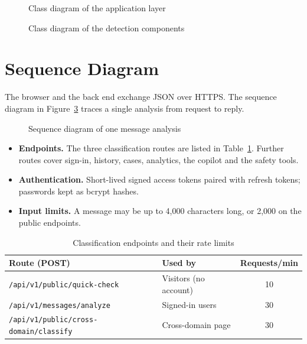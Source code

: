 \begin{figure}[H]
\centering
\resizebox{\linewidth}{!}{}
\caption{Class diagram of the application layer}
\label{fig:class1}
\end{figure}

\begin{figure}[H]
\centering
\resizebox{0.95\linewidth}{!}{}
\caption{Class diagram of the detection components}
\label{fig:class2}
\end{figure}

\section{Sequence Diagram}
The browser and the back end exchange JSON over HTTPS. The sequence diagram in Figure~\ref{fig:seq} traces a single analysis from request to reply.

\begin{figure}[H]
\centering
\resizebox{0.95\linewidth}{!}{}
\caption{Sequence diagram of one message analysis}
\label{fig:seq}
\end{figure}

\begin{itemize}
\item \textbf{Endpoints.} The three classification routes are listed in Table~\ref{tab:endpoints}. Further routes cover sign-in, history, cases, analytics, the copilot and the safety tools.
\item \textbf{Authentication.} Short-lived signed access tokens paired with refresh tokens; passwords kept as bcrypt hashes.
\item \textbf{Input limits.} A message may be up to 4,000 characters long, or 2,000 on the public endpoints.
\end{itemize}

\begin{table}[H]
\centering
\caption{Classification endpoints and their rate limits}
\label{tab:endpoints}
\small
\begin{tabular}{|l|l|c|}
\hline
\textbf{Route (POST)} & \textbf{Used by} & \textbf{Requests/min} \\
\hline
\texttt{/api/v1/public/quick-check} & Visitors (no account) & 10 \\
\hline
\texttt{/api/v1/messages/analyze} & Signed-in users & 30 \\
\hline
\texttt{/api/v1/public/cross-domain/classify} & Cross-domain page & 30 \\
\hline
\end{tabular}
\end{table}
